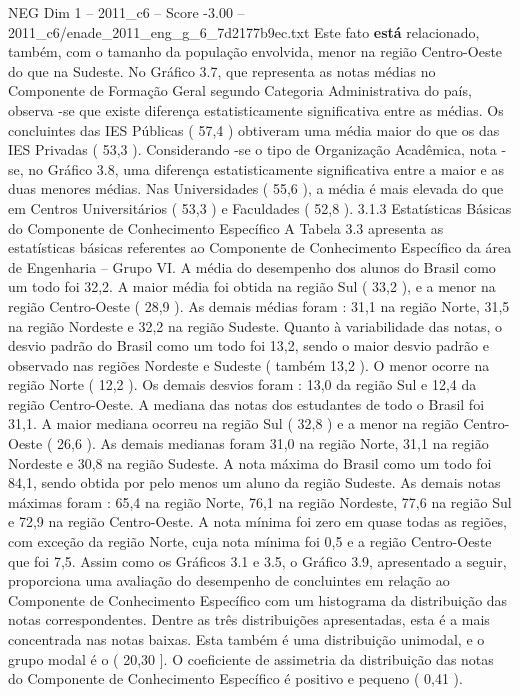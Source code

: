 \begin{textsample}{NEG Dim 1 – 2011\_c6 – Score -3.00 – 2011\_c6/enade\_2011\_eng\_g\_6\_7d2177b9ec.txt}
Este fato \textbf{está} relacionado, também, com o tamanho da população envolvida, menor na região Centro-Oeste do que na Sudeste.
No Gráfico 3.7, que representa as notas médias no Componente de Formação Geral segundo Categoria Administrativa do país, observa -se que existe diferença estatisticamente significativa entre as médias.
Os concluintes das IES Públicas ( 57,4 ) obtiveram uma média maior do que os das IES Privadas ( 53,3 ).
Considerando -se o tipo de Organização Acadêmica, nota -se, no Gráfico 3.8, uma diferença estatisticamente significativa entre a maior e as duas menores médias.
Nas Universidades ( 55,6 ), a média é mais elevada do que em Centros Universitários ( 53,3 ) e Faculdades ( 52,8 ). 3.1.3 Estatísticas Básicas do Componente de Conhecimento Específico A Tabela 3.3 apresenta as estatísticas básicas referentes ao Componente de Conhecimento Específico da área de Engenharia – Grupo VI.
A média do desempenho dos alunos do Brasil como um todo foi 32,2.
A maior média foi obtida na região Sul ( 33,2 ), e a menor na região Centro-Oeste ( 28,9 ).
As demais médias foram : 31,1 na região Norte, 31,5 na região Nordeste e 32,2 na região Sudeste.
Quanto à variabilidade das notas, o desvio padrão do Brasil como um todo foi 13,2, sendo o maior desvio padrão e observado nas regiões Nordeste e Sudeste ( também 13,2 ).
O menor ocorre na região Norte ( 12,2 ).
Os demais desvios foram : 13,0 da região Sul e 12,4 da região Centro-Oeste.
A mediana das notas dos estudantes de todo o Brasil foi 31,1.
A maior mediana ocorreu na região Sul ( 32,8 ) e a menor na região Centro-Oeste ( 26,6 ).
As demais medianas foram 31,0 na região Norte, 31,1 na região Nordeste e 30,8 na região Sudeste.
A nota máxima do Brasil como um todo foi 84,1, sendo obtida por pelo menos um aluno da região Sudeste.
As demais notas máximas foram : 65,4 na região Norte, 76,1 na região Nordeste, 77,6 na região Sul e 72,9 na região Centro-Oeste.
A nota mínima foi zero em quase todas as regiões, com exceção da região Norte, cuja nota mínima foi 0,5 e a região Centro-Oeste que foi 7,5.
Assim como os Gráficos 3.1 e 3.5, o Gráfico 3.9, apresentado a seguir, proporciona uma avaliação do desempenho de concluintes em relação ao Componente de Conhecimento Específico com um histograma da distribuição das notas correspondentes.
Dentre as três distribuições apresentadas, esta é a mais concentrada nas notas baixas.
Esta também é uma distribuição unimodal, e o grupo modal é o ( 20,30 ].
O coeficiente de assimetria da distribuição das notas do Componente de Conhecimento Específico é positivo e pequeno ( 0,41 ).

\end{textsample}
